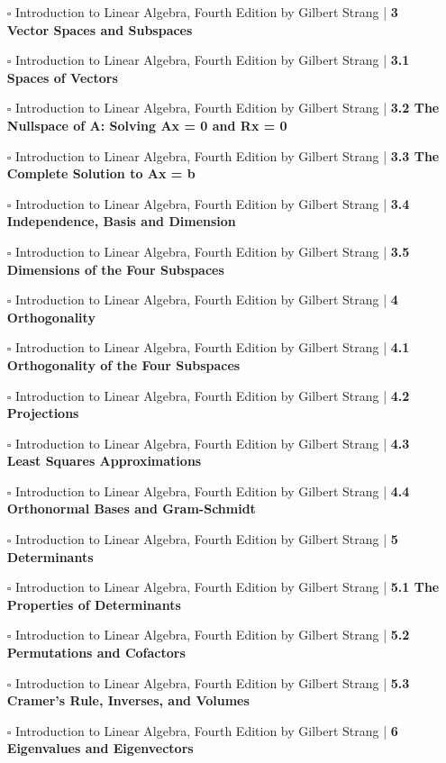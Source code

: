 \documentclass[a4, landscape, 12pt]{article}
\newcommand{\checkbox}{$\square$}%
\begin{document}
\begin{itemize}
{}
\item [\checkbox] Introduction to Linear Algebra, Fourth Edition by Gilbert Strang  | \textbf{3 Vector Spaces and Subspaces
}
\item [\checkbox] Introduction to Linear Algebra, Fourth Edition by Gilbert Strang  | \textbf{3.1 Spaces of Vectors
}
\item [\checkbox] Introduction to Linear Algebra, Fourth Edition by Gilbert Strang  | \textbf{3.2 The Nullspace of A: Solving Ax = 0 and Rx = 0
}
\item [\checkbox] Introduction to Linear Algebra, Fourth Edition by Gilbert Strang  | \textbf{3.3 The Complete Solution to Ax = b
}
\item [\checkbox] Introduction to Linear Algebra, Fourth Edition by Gilbert Strang  | \textbf{3.4 Independence, Basis and Dimension
}
\item [\checkbox] Introduction to Linear Algebra, Fourth Edition by Gilbert Strang  | \textbf{3.5 Dimensions of the Four Subspaces
}
\item [\checkbox] Introduction to Linear Algebra, Fourth Edition by Gilbert Strang  | \textbf{4 Orthogonality
}
\item [\checkbox] Introduction to Linear Algebra, Fourth Edition by Gilbert Strang  | \textbf{4.1 Orthogonality of the Four Subspaces
}
\item [\checkbox] Introduction to Linear Algebra, Fourth Edition by Gilbert Strang  | \textbf{4.2 Projections
}
\item [\checkbox] Introduction to Linear Algebra, Fourth Edition by Gilbert Strang  | \textbf{4.3 Least Squares Approximations
}
\item [\checkbox] Introduction to Linear Algebra, Fourth Edition by Gilbert Strang  | \textbf{4.4 Orthonormal Bases and Gram-Schmidt
}
\item [\checkbox] Introduction to Linear Algebra, Fourth Edition by Gilbert Strang  | \textbf{5 Determinants
}
\item [\checkbox] Introduction to Linear Algebra, Fourth Edition by Gilbert Strang  | \textbf{5.1 The Properties of Determinants
}
\item [\checkbox] Introduction to Linear Algebra, Fourth Edition by Gilbert Strang  | \textbf{5.2 Permutations and Cofactors
}
\item [\checkbox] Introduction to Linear Algebra, Fourth Edition by Gilbert Strang  | \textbf{5.3 Cramer’s Rule, Inverses, and Volumes
}
\item [\checkbox] Introduction to Linear Algebra, Fourth Edition by Gilbert Strang  | \textbf{6 Eigenvalues and Eigenvectors
}
\end{itemize}
\end{document}
